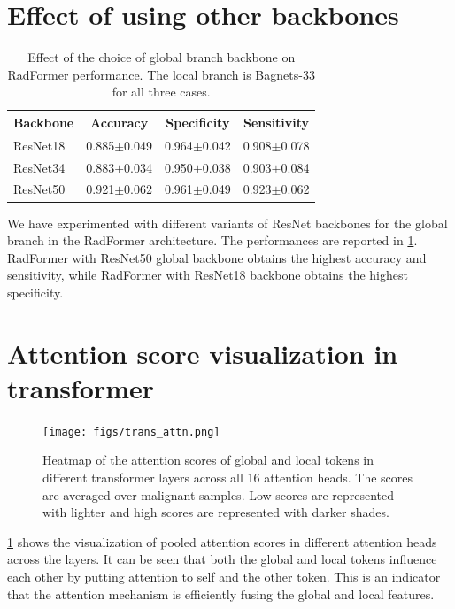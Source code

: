\documentclass[twocolumn,final]{elsarticle}
\def\myarch{RadFormer\xspace}
\begin{document}
\section{Effect of using other backbones}
%
\begin{table}[t]
   \centering
	\begin{tabular}{lccc}
		\toprule
		\textbf{Backbone} & \textbf{Accuracy} 
		&  \textbf{Specificity} & \textbf{Sensitivity}  \\
		\midrule
		ResNet18 & 0.885$\pm$0.049 & 0.964$\pm$0.042 & 0.908$\pm$0.078 \\
		ResNet34 & 0.883$\pm$0.034 & 0.950$\pm$0.038 & 0.903$\pm$0.084 \\
		ResNet50 & 0.921$\pm$0.062 & 0.961$\pm$0.049 & 0.923$\pm$0.062 \\
		\bottomrule
	\end{tabular}
	\caption{Effect of the choice of global branch backbone on \myarch performance. The local branch is Bagnets-33 for all three cases.}
    \label{tab:ablation-backbone}
\end{table}
We have experimented with different variants of ResNet backbones for the global branch in the \myarch architecture. The performances are reported in \cref{tab:ablation-backbone}. \myarch with ResNet50 global backbone obtains the highest accuracy and sensitivity, while \myarch with ResNet18 backbone obtains the highest specificity.

\section{Attention score visualization in transformer}
%
\begin{figure}
    \centering
    \texttt{[image: figs/trans\_attn.png]}
    \caption{Heatmap of the attention scores of global and local tokens in different transformer layers across all 16 attention heads. The scores are averaged over malignant samples. Low scores are represented with lighter and high scores are represented with darker shades.}
    \label{fig:attn_score}
\end{figure}

\cref{fig:attn_score} shows the visualization of pooled attention scores in different attention heads across the layers. It can be seen that both the global and local tokens influence each other by putting attention to self and the other token. This is an indicator that the attention mechanism is efficiently fusing the global and local features.
\end{document}
